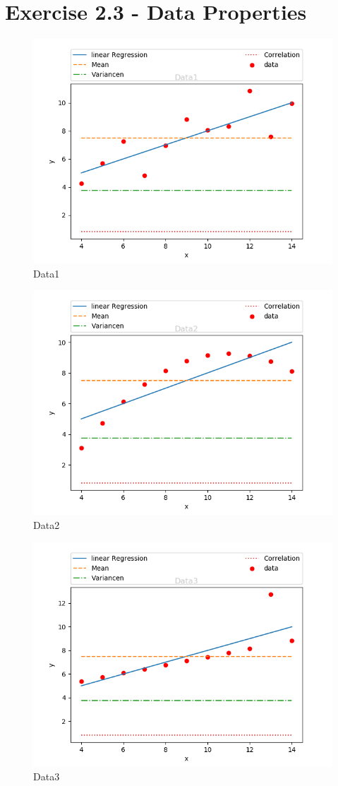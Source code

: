 \documentclass[a4paper]{article}
\begin{document}
	\section*{Exercise 2.3 - Data Properties}
	\begin{figure}[!ht]
		\centering
		\includegraphics[width=0.7\linewidth]{Data1}
		\caption{Data1}
		\label{fig:data1}
	\end{figure}
	\begin{figure}[!ht]
		\centering
		\includegraphics[width=0.7\linewidth]{Data2}
		\caption{Data2}
		\label{fig:data1}
	\end{figure}
	\begin{figure}[!ht]
		\centering
		\includegraphics[width=0.7\linewidth]{Data3}
		\caption{Data3}
		\label{fig:data1}
	\end{figure}
\end{document}
